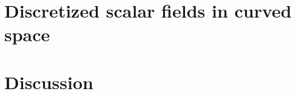 \documentclass[aps,showpacs,onecolumn,floats,prd,superscriptaddress,nofootinbib]{revtex4-1}
\begin{document}
\section{Discretized scalar fields in curved space} \label{sec:QFTcurved}

\section{Discussion} \label{sec:Discuss}





\end{document}
